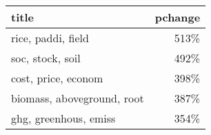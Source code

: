 \begin{tabular}{lr}
\toprule
                      title &  pchange \\
\midrule
         rice, paddi, field &     513\% \\
           soc, stock, soil &     492\% \\
        cost, price, econom &     398\% \\
 biomass, aboveground, root &     387\% \\
      ghg, greenhous, emiss &     354\% \\
\bottomrule
\end{tabular}
